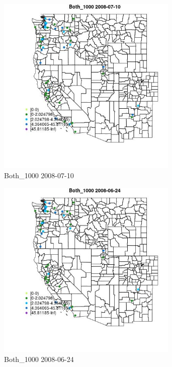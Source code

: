 \begin{figure} 
\centering  
\includegraphics[width=0.77\textwidth]{Code_Outputs/Report_ML_input_PM25_Step4_part_e_de_duplicated_aves_MapObsBoth_10002008-07-10.jpg} 
\caption{\label{fig:Report_ML_input_PM25_Step4_part_e_de_duplicated_avesMapObsBoth_10002008-07-10}Both_1000 2008-07-10} 
\end{figure} 
 

\begin{figure} 
\centering  
\includegraphics[width=0.77\textwidth]{Code_Outputs/Report_ML_input_PM25_Step4_part_e_de_duplicated_aves_MapObsBoth_10002008-06-24.jpg} 
\caption{\label{fig:Report_ML_input_PM25_Step4_part_e_de_duplicated_avesMapObsBoth_10002008-06-24}Both_1000 2008-06-24} 
\end{figure} 
 

